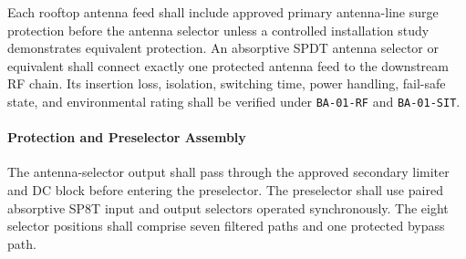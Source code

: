 \documentclass[11pt,a4paper]{article}
\begin{document}
	Each rooftop antenna feed shall include approved primary antenna-line surge
	protection before the antenna selector unless a controlled installation study
	demonstrates equivalent protection. An absorptive SPDT antenna selector or
	equivalent shall connect exactly one protected antenna feed to the downstream
	RF chain. Its insertion loss, isolation, switching time, power handling,
	fail-safe state, and environmental rating shall be verified under
	\texttt{BA-01-RF} and \texttt{BA-01-SIT}.
	
	\paragraph*{Protection and Preselector Assembly}
	
	The antenna-selector output shall pass through the approved secondary limiter
	and DC block before entering the preselector. The preselector shall use paired
	absorptive SP8T input and output selectors operated synchronously. The eight
	selector positions shall comprise seven filtered paths and one protected
	bypass path.
	
\end{document}

